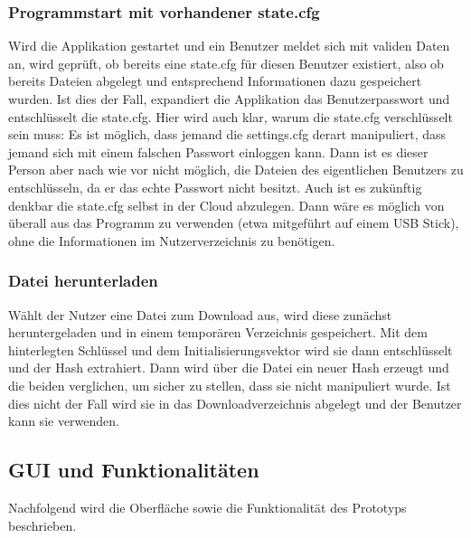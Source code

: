 \documentclass[13pt,a4paper,bibliography=totocnumbered,listof=totocnumbered]{scrartcl}
\begin{document}
\subsubsection{Programmstart mit vorhandener state.cfg}
Wird die Applikation gestartet und ein Benutzer meldet sich mit validen Daten an, wird geprüft, ob bereits eine state.cfg für diesen Benutzer existiert, also ob bereits Dateien abgelegt und entsprechend Informationen dazu gespeichert wurden. Ist dies der Fall, expandiert die Applikation das Benutzerpasswort und entschlüsselt die state.cfg. Hier wird auch klar, warum die state.cfg verschlüsselt sein muss: Es ist möglich, dass jemand die settings.cfg derart manipuliert, dass jemand sich mit einem falschen Passwort einloggen kann. Dann ist es dieser Person aber nach wie vor nicht möglich, die Dateien des eigentlichen Benutzers zu entschlüsseln, da er das echte Passwort nicht besitzt. Auch ist es zukünftig denkbar die state.cfg selbst in der Cloud abzulegen. Dann wäre es möglich von überall aus das Programm zu verwenden (etwa mitgeführt auf einem USB Stick), ohne die Informationen im Nutzerverzeichnis zu benötigen.
\subsubsection{Datei herunterladen}
Wählt der Nutzer eine Datei zum Download aus, wird diese zunächst heruntergeladen und in einem temporären Verzeichnis gespeichert. Mit dem hinterlegten Schlüssel und dem Initialisierungsvektor wird sie dann entschlüsselt und der Hash extrahiert. Dann wird über die Datei ein neuer Hash erzeugt und die beiden verglichen, um sicher zu stellen, dass sie nicht manipuliert wurde. Ist dies nicht der Fall wird sie in das Downloadverzeichnis abgelegt und der Benutzer kann sie verwenden.

\subsection{GUI und Funktionalitäten}\label{GUIV}
Nachfolgend wird die Oberfläche sowie die Funktionalität des Prototyps beschrieben.
\end{document}
